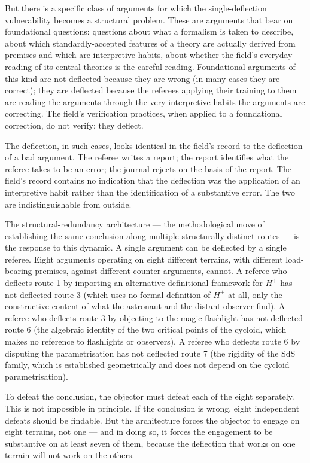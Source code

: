 \documentclass[11pt,a4paper]{article}
\begin{document}
But there is a specific class of arguments for which the single-deflection vulnerability becomes a structural problem. These are arguments that bear on foundational questions: questions about what a formalism is taken to describe, about which standardly-accepted features of a theory are actually derived from premises and which are interpretive habits, about whether the field's everyday reading of its central theories is the careful reading. Foundational arguments of this kind are not deflected because they are wrong (in many cases they are correct); they are deflected because the referees applying their training to them are reading the arguments through the very interpretive habits the arguments are correcting. The field's verification practices, when applied to a foundational correction, do not verify; they deflect.

The deflection, in such cases, looks identical in the field's record to the deflection of a bad argument. The referee writes a report; the report identifies what the referee takes to be an error; the journal rejects on the basis of the report. The field's record contains no indication that the deflection was the application of an interpretive habit rather than the identification of a substantive error. The two are indistinguishable from outside.

The structural-redundancy architecture --- the methodological move of establishing the same conclusion along multiple structurally distinct routes --- is the response to this dynamic. A single argument can be deflected by a single referee. Eight arguments operating on eight different terrains, with different load-bearing premises, against different counter-arguments, cannot. A referee who deflects route 1 by importing an alternative definitional framework for $H^+$ has not deflected route 3 (which uses no formal definition of $H^+$ at all, only the constructive content of what the astronaut and the distant observer find). A referee who deflects route 3 by objecting to the magic flashlight has not deflected route 6 (the algebraic identity of the two critical points of the cycloid, which makes no reference to flashlights or observers). A referee who deflects route 6 by disputing the parametrisation has not deflected route 7 (the rigidity of the SdS family, which is established geometrically and does not depend on the cycloid parametrisation).

To defeat the conclusion, the objector must defeat each of the eight separately. This is not impossible in principle. If the conclusion is wrong, eight independent defeats should be findable. But the architecture forces the objector to engage on eight terrains, not one --- and in doing so, it forces the engagement to be substantive on at least seven of them, because the deflection that works on one terrain will not work on the others.
\end{document}
